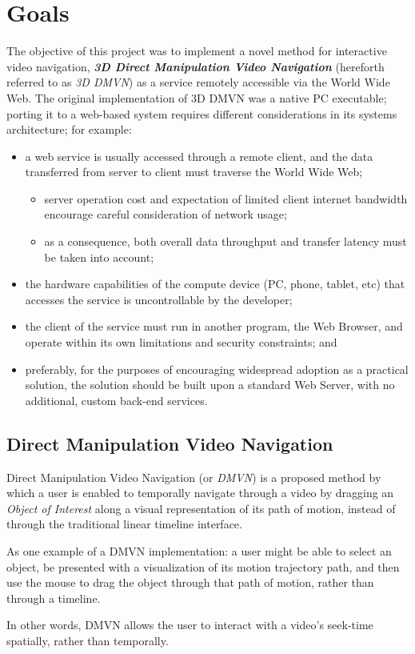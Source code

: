 \section{Goals}
The objective of this project was to implement a novel method for interactive video navigation, \textbf{\emph{3D Direct Manipulation Video Navigation}} \cite{dmvn} (hereforth referred to as \emph{3D DMVN}) as a service remotely accessible via the World Wide Web. The original implementation of 3D DMVN was a native PC executable; porting it to a web-based system requires different considerations in its systems architecture; for example:
\begin{itemize}
    \item a web service is usually accessed through a remote client, and the data transferred from server to client must traverse the World Wide Web;
    \begin{itemize}
        \item server operation cost and expectation of limited client internet bandwidth encourage careful consideration of network usage;
        \item as a consequence, both overall data throughput and transfer latency must be taken into account;
    \end{itemize}
    \item the hardware capabilities of the compute device (PC, phone, tablet, etc) that accesses the service is uncontrollable by the developer;
    \item the client of the service must run in another program, the Web Browser, and operate within its own limitations and security constraints; and
    \item preferably, for the purposes of encouraging widespread adoption as a practical solution, the solution should be built upon a standard Web Server, with no additional, custom back-end services.
\end{itemize}

\subsection{Direct Manipulation Video Navigation}
Direct Manipulation Video Navigation (or \emph{DMVN}) is a proposed method by which a user is enabled to temporally navigate through a video by dragging an \emph{Object of Interest} along a visual representation of its path of motion, instead of through the traditional linear timeline interface. \cite{dmvn}
\par As one example of a DMVN implementation: a user might be able to select an object, be presented with a visualization of its motion trajectory path, and then use the mouse to drag the object through that path of motion, rather than through a timeline.\par
In other words, DMVN allows the user to interact with a video's seek-time spatially, rather than temporally.

